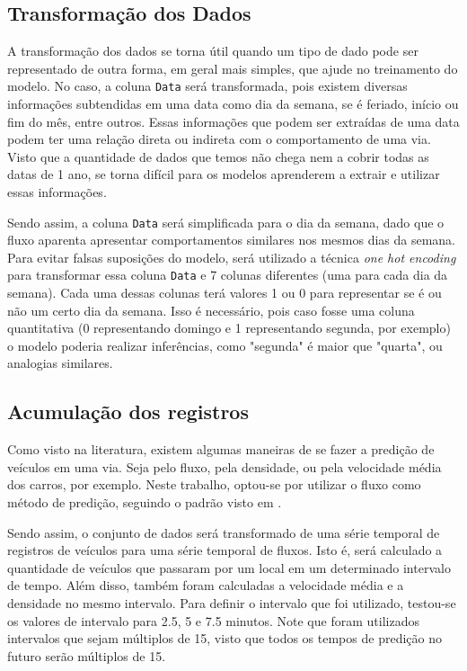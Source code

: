 \subsection{Transformação dos Dados}

A transformação dos dados se torna útil quando um tipo de dado pode ser representado de outra forma, em geral mais simples, que ajude no treinamento do modelo. No caso, a coluna \texttt{Data} será transformada, pois existem diversas informações subtendidas em uma data como dia da semana, se é feriado, início ou fim do mês, entre outros. Essas informações que podem ser extraídas de uma data podem ter uma relação direta ou indireta com o comportamento de uma via. Visto que a quantidade de dados que temos não chega nem a cobrir todas as datas de 1 ano, se torna difícil para os modelos aprenderem a extrair e utilizar essas informações. 

Sendo assim, a coluna \texttt{Data} será simplificada para o dia da semana, dado que o fluxo aparenta apresentar comportamentos similares nos mesmos dias da semana. Para evitar falsas suposições do modelo, será utilizado a técnica \textit{one hot encoding} para transformar essa coluna \texttt{Data} e 7 colunas diferentes (uma para cada dia da semana). Cada uma dessas colunas terá valores 1 ou 0 para representar se é ou não um certo dia da semana. Isso é necessário, pois caso fosse uma coluna quantitativa (0 representando domingo e 1 representando segunda, por exemplo) o modelo poderia realizar inferências, como "segunda" é maior que "quarta", ou analogias similares.

\subsection{Acumulação dos registros}

Como visto na literatura, existem algumas maneiras de se fazer a predição de veículos em uma via. Seja pelo fluxo, pela densidade, ou pela velocidade média dos carros, por exemplo. Neste trabalho, optou-se por utilizar o fluxo como método de predição, seguindo o padrão visto em \cite{lana_2018}.

Sendo assim, o conjunto de dados será transformado de uma série temporal de registros de veículos para uma série temporal de fluxos. Isto é, será calculado a quantidade de veículos que passaram por um local em um determinado intervalo de tempo. Além disso, também foram calculadas a velocidade média e a densidade no mesmo intervalo. Para definir o intervalo que foi utilizado, testou-se os valores de intervalo para 2.5, 5 e 7.5 minutos. Note que foram utilizados intervalos que sejam múltiplos de 15, visto que todos os tempos de predição no futuro serão múltiplos de 15.

